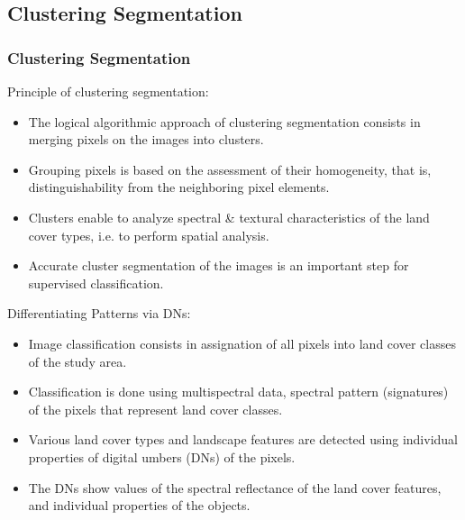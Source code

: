 \documentclass[pdflatex,compress,8pt,
	xcolor={dvipsnames,dvipsnames,svgnames,x11names,table},
	hyperref={colorlinks = true,
	breaklinks = true, 
	urlcolor = NavyBlue, 
	breaklinks = true}]{beamer}
\begin{document}
\subsection{Clustering Segmentation}
\begin{frame}\frametitle{Clustering Segmentation}
Principle of clustering segmentation:
\begin{itemize}
	\item The logical algorithmic approach of clustering segmentation consists in merging pixels on the images into clusters.
	\item Grouping pixels is based on the assessment of their homogeneity, that is, distinguishability from the neighboring pixel elements.
	\item Clusters enable to analyze spectral \& textural characteristics of the land cover types, i.e. to perform spatial analysis.
	\item Accurate cluster segmentation of the images is an important step for supervised classification.
\end{itemize}
Differentiating Patterns via DNs:
\begin{itemize}
	\item Image classification consists in assignation of all pixels into land cover classes of the study area.
	\item Classification is done using multispectral data, spectral pattern (signatures) of the pixels that represent land cover classes.
	\item Various land cover types and landscape features are detected using individual properties of digital umbers (DNs) of the pixels.
	\item The DNs show values of the spectral reflectance of the land cover features, and individual properties of the objects.
\end{itemize}
\end{frame}
\end{document}
